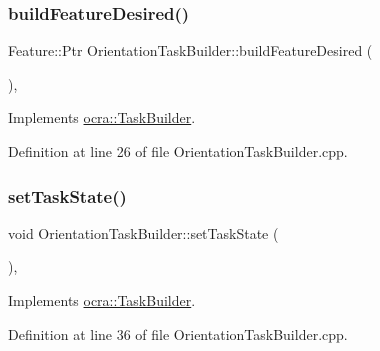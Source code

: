 \subsubsection{\texorpdfstring{build\+Feature\+Desired()}{buildFeatureDesired()}}
{\footnotesize\ttfamily Feature\+::\+Ptr Orientation\+Task\+Builder\+::build\+Feature\+Desired (\begin{DoxyParamCaption}{ }\end{DoxyParamCaption})\hspace{0.3cm}{\ttfamily [protected]}, {\ttfamily [virtual]}}



Implements \hyperlink{classocra_1_1TaskBuilder_a7a2c8bcc5d95160d0e48806a2648f1a5}{ocra\+::\+Task\+Builder}.



Definition at line 26 of file Orientation\+Task\+Builder.\+cpp.

\hypertarget{classocra_1_1OrientationTaskBuilder_ab30b211f4aa00ed4c78daae36aca6c42}{}\label{classocra_1_1OrientationTaskBuilder_ab30b211f4aa00ed4c78daae36aca6c42} 
\subsubsection{\texorpdfstring{set\+Task\+State()}{setTaskState()}}
{\footnotesize\ttfamily void Orientation\+Task\+Builder\+::set\+Task\+State (\begin{DoxyParamCaption}{ }\end{DoxyParamCaption})\hspace{0.3cm}{\ttfamily [protected]}, {\ttfamily [virtual]}}



Implements \hyperlink{classocra_1_1TaskBuilder_a7b44bfa101566ea4400e2d9bfdb9ff32}{ocra\+::\+Task\+Builder}.



Definition at line 36 of file Orientation\+Task\+Builder.\+cpp.

\hypertarget{classocra_1_1OrientationTaskBuilder_a491f3d3db66afb5b5e3230983b4b15c9}{}\label{classocra_1_1OrientationTaskBuilder_a491f3d3db66afb5b5e3230983b4b15c9} 
